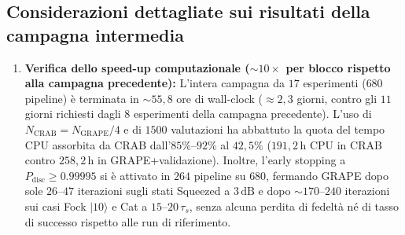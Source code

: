 \documentclass[11pt,a4paper]{article}
\begin{document}
\subsection{Considerazioni dettagliate sui risultati della campagna intermedia}

\begin{enumerate}
    \item \textbf{Verifica dello speed-up computazionale ($\sim 10\times$ per blocco rispetto alla campagna precedente):}
    L'intera campagna da $17$ esperimenti ($680$ pipeline) è terminata in $\sim 55{,}8$ ore di wall-clock ($\approx 2{,}3$ giorni, contro gli $11$ giorni richiesti dagli $8$ esperimenti della campagna precedente). L'uso di $N_{\text{CRAB}} = N_{\text{GRAPE}}/4$ e di $1500$ valutazioni ha abbattuto la quota del tempo CPU assorbita da CRAB dall'$85\%\text{--}92\%$ al $42{,}5\%$ ($191{,}2\,\text{h}$ CPU in CRAB contro $258{,}2\,\text{h}$ in GRAPE+validazione). Inoltre, l'early stopping a $P_{\text{disc}} \ge 0.99995$ si è attivato in $264$ pipeline su $680$, fermando GRAPE dopo sole $26\text{--}47$ iterazioni sugli stati Squeezed a $3\,\text{dB}$ e dopo $\sim 170\text{--}240$ iterazioni sui casi Fock $|10\rangle$ e Cat a $15\text{--}20\,\tau_s$, senza alcuna perdita di fedeltà né di tasso di successo rispetto alle run di riferimento.


\end{enumerate}
\end{document}
